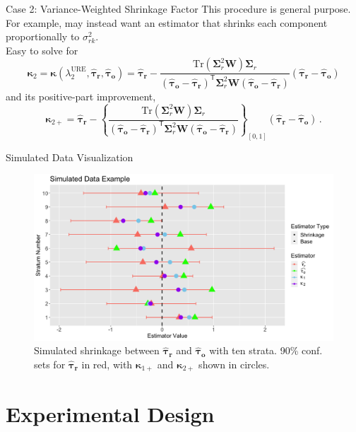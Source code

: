 \documentclass[usenames,dvipsnames]{beamer}
\newcommand{\htaur}{\boldsymbol{\hat \tau_r}}
\newcommand{\htauo}{\boldsymbol{\hat \tau_o}}
\newcommand{\bsD}{\boldsymbol{W}}
\newcommand{\bsSig}{\boldsymbol{\Sigma}}
\newcommand{\ident}{\boldsymbol{I}}
\newcommand{\bskap}{\boldsymbol{ \kappa}}
\newcommand{\Tr}{\text{Tr}}
\newcommand{\URE}{\text{URE}}
\newcommand{\tran}{\mathsf{T}}
\theoremstyle{definition} %
\begin{document}
\begin{frame}{Case 2: Variance-Weighted Shrinkage Factor}
This procedure is general purpose. For example, may instead want an estimator that shrinks each component proportionally to $\sigma_{rk}^2$.\\ 
\vspace{5mm} Easy to solve for
\[ \bskap_2 = \bskap(\lambda_2^{\URE}, \htaur, \htauo) = \htaur -  \frac{\Tr(\bsSig_r^2 \bsD)\bsSig_r}{(\htauo - \htaur)^\tran  \bsSig_r^2 \bsD (\htauo - \htaur) } \left( \htaur - \htauo \right) \]
and its positive-part improvement,
\[ \bskap_{2+} = \htaur - \left\{ \frac{\Tr(\bsSig_r^2 \bsD)\bsSig_r}{(\htauo - \htaur)^\tran  \bsSig_r^2 \bsD (\htauo - \htaur) } \right\}_{[0, 1]} \left( \htaur - \htauo \right) \,.\]
\end{frame}

\begin{frame}{Simulated Data Visualization}
\begin{figure}
\centering
\includegraphics[width =1.\textwidth]{Simulated_Visuals_v2}
\caption{Simulated shrinkage between \color{red}$\htaur$ \color{black} and \color{green}$\htauo$ \color{black} with ten strata. 90\% conf. sets for  \color{red}$\htaur$ \color{black} in  \color{red}red\color{black}, with \color{cyan}$\bskap_{1+}$ \color{black} and \color{darkorchid}$\bskap_{2+}$ \color{black} shown in circles. }
\end{figure}
\end{frame}

\section{Experimental Design}
\end{document}
